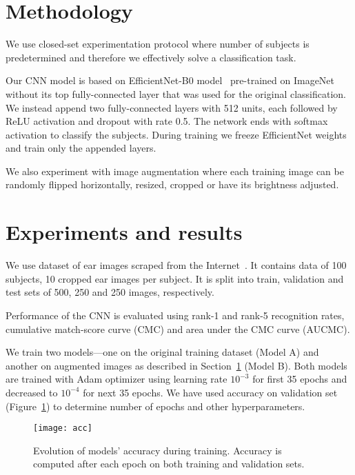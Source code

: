\documentclass[9pt]{IEEEtran}
\begin{document}
\section{Methodology}\label{sec:meth}

We use closed-set experimentation protocol where number of subjects is predetermined and therefore we effectively solve a classification task.

Our CNN model is based on EfficientNet-B0 model~\cite{efficientNet} pre-trained on ImageNet~\cite{imageNet} without its top fully-connected layer that was used for the original classification.
We instead append two fully-connected layers with 512 units, each followed by ReLU activation and dropout with rate 0.5.
The network ends with softmax activation to classify the subjects.
During training we freeze EfficientNet weights and train only the appended layers.

We also experiment with image augmentation where each training image can be randomly flipped horizontally, resized, cropped or have its brightness adjusted.

\section{Experiments and results}

We use dataset of ear images scraped from the Internet~\cite{awe}.
It contains data of 100 subjects, 10 cropped ear images per subject.
It is split into train, validation and test sets of 500, 250 and 250 images, respectively.

Performance of the CNN is evaluated using rank-1 and rank-5 recognition rates, cumulative match-score curve (CMC) and area under the CMC curve (AUCMC).

We train two models---one on the original training dataset (Model A) and another on augmented images as described in Section~\ref{sec:meth} (Model B).
Both models are trained with Adam optimizer using learning rate $10^{-3}$ for first 35 epochs and decreased to $10^{-4}$ for next 35 epochs.
We have used accuracy on validation set (Figure~\ref{fig:acc}) to determine number of epochs and other hyperparameters.

\begin{figure}[ht]
    \centering
    \texttt{[image: acc]}
    \caption{Evolution of models' accuracy during training.
    Accuracy is computed after each epoch on both training and validation sets.}
    \label{fig:acc}
\end{figure}
\end{document}
